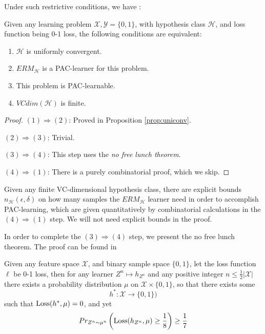 Under such restrictive conditions, we have \cite[Theorem 6.7]{shalev-shwartzUnderstandingMachineLearning2014}:
\begin{theorem}
\label{theorem:funtheo_slt}
Given any learning problem $\mathcal{X}, \mathcal{Y} = \{0, 1\}$, with hypothesis class $\mathcal{H}$, and loss function being 0-1 loss, the following conditions are equivalent:
\begin{enumerate}[(1)]
	\item $\mathcal{H}$ is uniformly convergent. 
	\item $ERM_{\mathcal{H}}$ is a PAC-learner for this problem.
	\item This problem is PAC-learnable.
	\item $VCdim(\mathcal{H})$ is finite.
\end{enumerate}
\end{theorem}
\begin{proof}
	$(1) \Rightarrow (2)$: Proved in Proposition \ref{prop:uniconv}.
	
	$(2) \Rightarrow (3)$: Trivial.
	
	$(3) \Rightarrow (4)$: This step uses the \textit{no free lunch theorem}.
	
	$(4) \Rightarrow (1)$: There is a purely combinatorial proof, which we skip.
\end{proof}

Given any finite VC-dimensional hypothesis class, there are explicit bounds $n_{\mathcal{H}}(\epsilon, \delta)$ on how many samples the $ERM_\mathcal{H}$ learner need in order to accomplish PAC-learning, which are given quantitatively by combinatorial calculations in the $(4) \Rightarrow (1)$ step. We will not need explicit bounds in the proof. 

In order to complete the $(3) \Rightarrow (4)$ step, we present the no free lunch theorem. The proof can be found in \cite[Theorem 5.1]{shalev-shwartzUnderstandingMachineLearning2014}
\begin{theorem}
\label{theorem:nfl}
Given any feature space $\mathcal{X}$, and binary sample space $\{0, 1\}$, let the loss function $\ell$ be 0-1 loss, then for any learner $Z^n \mapsto h_{Z^n}$ and any positive integer $n \le \frac 1 2 |\mathcal{X}|$ there exists a probability distribution $\mu$ on $\mathcal{X}\times\{0, 1\}$, so that there exists some 
$$h^* : \mathcal{X} \to \{0, 1\})$$
such that $\operatorname{Loss}(h^*, \mu) = 0$, and yet
\begin{equation}
	\label{eq:nfl}
Pr_{Z^n \sim \mu^n}\left(\operatorname{Loss}(h_{Z^n}, \mu) \ge \frac 1 8\right) \ge \frac 1 7
\end{equation}
\end{theorem}

